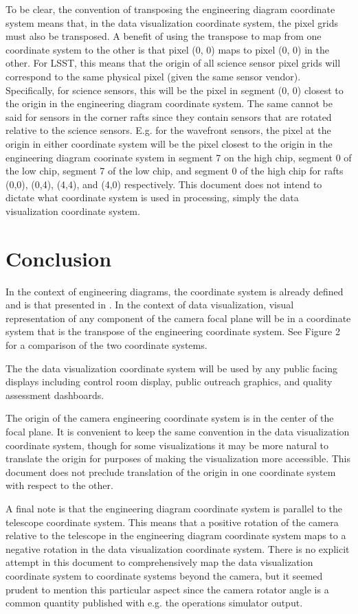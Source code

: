 To be clear, the convention of transposing the engineering diagram coordinate system means that, in the data visualization coordinate system, the pixel grids must also be transposed.  A benefit of using the transpose to map from one coordinate system to the other is that pixel (0, 0) maps to pixel (0, 0) in the other.  For LSST, this means that the origin of all science sensor pixel grids will correspond to the same physical pixel (given the same sensor vendor).  Specifically, for science sensors, this will be the pixel in segment (0, 0) closest to the origin in the engineering diagram coordinate system.  The same cannot be said for sensors in the corner rafts since they contain sensors that are rotated relative to the science sensors.  E.g. for the wavefront sensors, the pixel at the origin in either coordinate system will be the pixel closest to the origin in the engineering diagram coorinate system in segment 7 on the high chip, segment 0 of the low chip, segment 7 of the low chip, and segment 0 of the high chip for rafts (0,0), (0,4), (4,4), and (4,0) respectively.  This document does not intend to dictate what coordinate system is used in processing, simply the data visualization coordinate system.

\section{Conclusion}
In the context of engineering diagrams, the coordinate system is already defined and is that presented in . In the context of data visualization, visual representation of any component of the camera focal plane will be in a coordinate system that is the transpose of the engineering coordinate system.  See Figure 2 for a comparison of the two coordinate systems.

The the data visualization coordinate system will be used by any public facing displays including control room display, public outreach graphics, and quality assessment dashboards.

The origin of the camera engineering coordinate system is in the center of the focal plane. It is convenient to keep the same convention in the data visualization coordinate system, though for some visualizations it may be more natural to translate the origin for purposes of making the visualization more accessible. This document does not preclude translation of the origin in one coordinate system with respect to the other.

A final note is that the engineering diagram coordinate system is parallel to the telescope coordinate system.  This means that a positive rotation of the camera relative to the telescope in the engineering diagram coordinate system maps to a negative rotation in the data visualization coordinate system.  There is no explicit attempt in this document to comprehensively map the data visualization coordinate system to coordinate systems beyond the camera, but it seemed prudent to mention this particular aspect since the camera rotator angle is a common quantity published with e.g. the operations simulator output.


